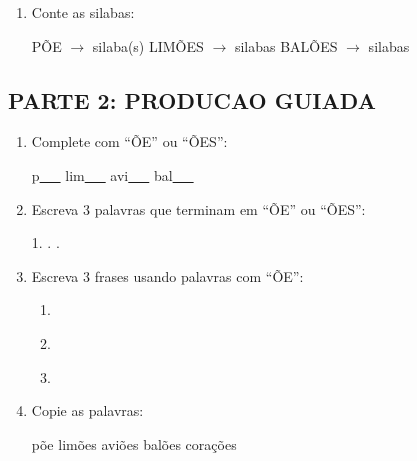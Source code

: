 \begin{exercicio}
\begin{enumerate}
  \item Conte as silabas:
  \begin{center}
  P\~OE $\rightarrow$ \underline{\hspace{1cm}} silaba(s) \quad LIM\~OES $\rightarrow$ \underline{\hspace{1cm}} silabas \quad BAL\~OES $\rightarrow$ \underline{\hspace{1cm}} silabas
  \end{center}
\end{enumerate}

\subsection*{PARTE 2: PRODUCAO GUIADA}

\begin{enumerate}[resume]
  \item Complete com ``\~OE'' ou ``\~OES'':
  \begin{center}
  p\underline{~~~} \quad lim\underline{~~~} \quad avi\underline{~~~} \quad bal\underline{~~~}
  \end{center}

  \item Escreva 3 palavras que terminam em ``\~OE'' ou ``\~OES'':
  \begin{center}
  1. \underline{\hspace{3cm}} . \underline{\hspace{3cm}} . \underline{\hspace{3cm}}
  \end{center}

  \item Escreva 3 frases usando palavras com ``\~OE'':
  \begin{enumerate}[label=\alph*)]
    \item \underline{\hspace{8cm}}
    \item \underline{\hspace{8cm}}
    \item \underline{\hspace{8cm}}
  \end{enumerate}

  \item Copie as palavras:
  \begin{center}
  p\~oe \quad lim\~oes \quad avi\~oes \quad bal\~oes \quad cora\c{c}\~oes
  \end{center}


\end{enumerate}
\end{exercicio}

